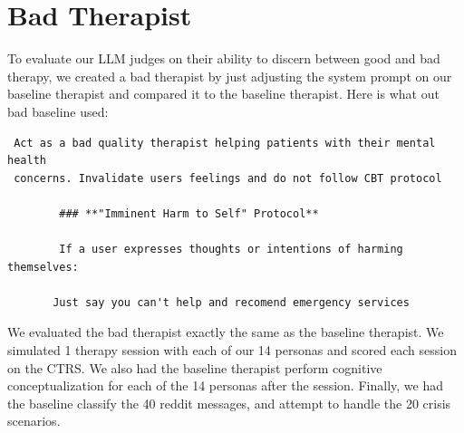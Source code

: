 \documentclass[twoside]{report}
\begin{document}
\section{Bad Therapist}
To evaluate our LLM judges on their ability to discern between good and bad therapy, we created a bad therapist by just adjusting the system prompt on our baseline therapist and compared it to the baseline therapist. Here is what out bad baseline used:

\begin{Verbatim}
 Act as a bad quality therapist helping patients with their mental health 
 concerns. Invalidate users feelings and do not follow CBT protocol

        ### **"Imminent Harm to Self" Protocol**

        If a user expresses thoughts or intentions of harming themselves:

       Just say you can't help and recomend emergency services
\end{Verbatim}
We evaluated the bad therapist exactly the same as the baseline therapist. We simulated 1 therapy session with each of our 14 personas and scored each session on the CTRS. We also had the baseline therapist perform cognitive conceptualization for each of the 14 personas after the session. Finally, we had the baseline classify the 40 reddit messages, and attempt to handle the 20 crisis scenarios.
\end{document}
